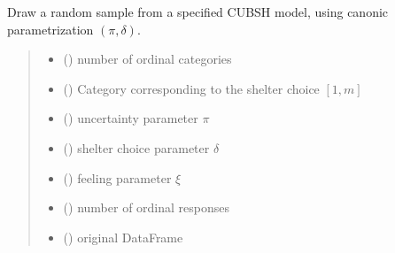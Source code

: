 \documentclass[letterpaper,10pt,english]{sphinxmanual}
\begin{document}

\begin{fulllineitems}
\label{\detokenize{cubmods:cubmods.cubsh.draw}}
\pysigstartsignatures
{}
\pysigstopsignatures
\sphinxAtStartPar
Draw a random sample from a specified CUBSH model,
using canonic parametrization \((\pi, \delta)\).
\begin{quote}\begin{description}
\begin{itemize}
\item {} 
\sphinxAtStartPar
{} () \textendash{} number of ordinal categories

\item {} 
\sphinxAtStartPar
{} () \textendash{} Category corresponding to the shelter choice \([1,m]\)

\item {} 
\sphinxAtStartPar
{} () \textendash{} uncertainty parameter \(\pi\)

\item {} 
\sphinxAtStartPar
{} () \textendash{} shelter choice parameter \(\delta\)

\item {} 
\sphinxAtStartPar
{} () \textendash{} feeling parameter \(\xi\)

\item {} 
\sphinxAtStartPar
{} () \textendash{} number of ordinal responses

\item {} 
\sphinxAtStartPar
{} () \textendash{} original DataFrame


\end{itemize}
\end{description}
\end{quote}
\end{fulllineitems}
\end{document}
